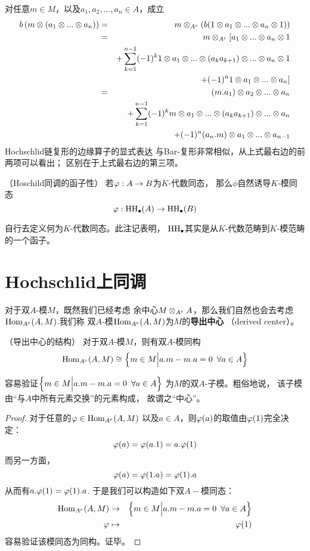 对任意$m\in M$，以及$a_1,a_2,...,a_n\in A$，成立
\begin{eqnarray*}
    b\left(m\otimes (a_1\otimes...\otimes a_n)\right)
&=& m\otimes_{A^e}
      \left(
        b(1\otimes a_1\otimes...\otimes a_n\otimes 1)
      \right)\\
&=& m\otimes_{A^e}
      \large[
        a_1\otimes...\otimes a_n\otimes 1
      \\
&&+  \sum_{k=1}^{n-1}(-1)^k
           1\otimes a_1\otimes...\otimes(a_ka_{k+1})\otimes...\otimes a_n\otimes 1\\
&&+
        (-1)^n1\otimes a_1\otimes...\otimes a_n
    \large]\\
&=& (m.a_1)\otimes a_2\otimes...\otimes a_n\\
&&+ \sum_{k=1}^{n-1}(-1)^k
      m\otimes a_1\otimes...\otimes(a_ka_{k+1})\otimes...\otimes a_n\\
&&+ (-1)^n(a_n.m)\otimes a_1\otimes...\otimes a_{n-1}
\end{eqnarray*}
Hochschlid链复形的边缘算子的显式表达
与Bar-复形非常相似，从上式最右边的前两项可以看出；
区别在于上式最右边的第三项。\vs

\begin{rem}（Hoschild同调的函子性）
若$\varphi:A\to B$为$K$-代数同态，
那么$\phi$自然诱导$K$-模同态
$$\varphi:\operatorname{HH}_{\bullet}(A)\to \operatorname{HH}_{\bullet}(B)$$
\end{rem}
自行去定义何为$K$-代数同态。此注记表明，
$\operatorname{HH}_{\bullet}$其实是从$K$-代数范畴到$K$-模范畴的一个函子。

\section{Hochschlid上同调}

对于双$A$-模$M$，既然我们已经考虑
余中心$M\otimes_{A^e}A$，那么我们自然也会去考虑
$\operatorname{Hom}_{A^e}(A,M)$.我们称
双$A$-模$\operatorname{Hom}_{A^e}(A,M)$为$M$的\textbf{导出中心}
（derived center）。

\begin{prop}（导出中心的结构）
\label{双模的导出中心的结构prop}
对于双$A$-模$M$，则有双$A$-模同构
$$\operatorname{Hom}_{A^e}(A,M)
\cong\Big\{ m\in M \Big| a.m-m.a=0\,\,\,\forall a\in A \Big\}$$
\end{prop}

容易验证$\Big\{ m\in M \Big| a.m-m.a=0\,\,\,\forall a\in A \Big\}$
为$M$的双$A$-子模。粗俗地说，
该子模由“与$A$中所有元素交换”的元素构成，
故谓之“中心”。

\begin{proof}对于任意的$\varphi\in\operatorname{Hom}_{A^e}(A,M)$
以及$a\in A$，则$\varphi(a)$的取值由$\varphi(1)$完全决定：
$$\varphi(a)=\varphi(a.1)=a.\varphi(1)$$
而另一方面，
$$\varphi(a)=\varphi(1.a)=\varphi(1).a$$
从而有$a.\varphi(1)=\varphi(1).a$.
于是我们可以构造如下双$A-$模同态：
\begin{eqnarray*}
\operatorname{Hom}_{A^e}(A,M)
&\to&\Big\{ m\in M \Big| a.m-m.a=0\,\,\,\forall a\in A \Big\}\\
\varphi&\mapsto&\varphi(1)
\end{eqnarray*}
容易验证该模同态为同构。证毕。
\end{proof}

